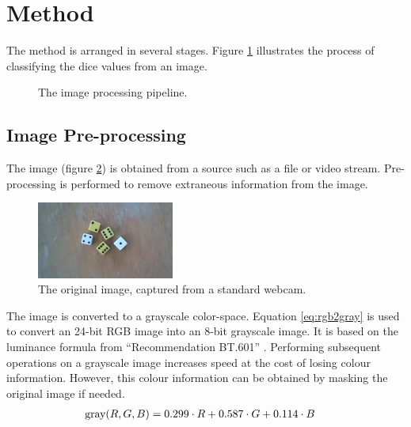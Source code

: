 \documentclass[conference]{IEEEtran}
\begin{document}
\section{Method}

The method is arranged in several stages.
Figure \ref{fig:stages} illustrates the process of classifying the dice values from an image. 
\begin{figure}
	\centering
	\caption{The image processing pipeline.}
	\label{fig:stages}
\end{figure}

\subsection{Image Pre-processing}

The image (figure \ref{fig:original}) is obtained from a source such as a file or video stream.
Pre-processing is performed to remove extraneous information from the image.
\begin{figure}
	\centering
	\includegraphics[width=0.4\textwidth]{original}
	\caption{The original image, captured from a standard webcam.}
	\label{fig:original}
\end{figure}

The image is converted to a grayscale color-space.
Equation \ref{eq:rgb2gray} is used to convert an 24-bit RGB image into an 8-bit grayscale image.
It is based on the luminance formula from ``Recommendation BT.601'' \cite{R2011}.
Performing subsequent operations on a grayscale image increases speed at the cost of losing colour information.
However, this colour information can be obtained by masking the original image if needed.
\begin{align}
	\textnormal{gray}(R, G, B) &= 0.299 \cdot R + 0.587 \cdot G + 0.114 \cdot B \label{eq:rgb2gray}
\end{align}
\end{document}
